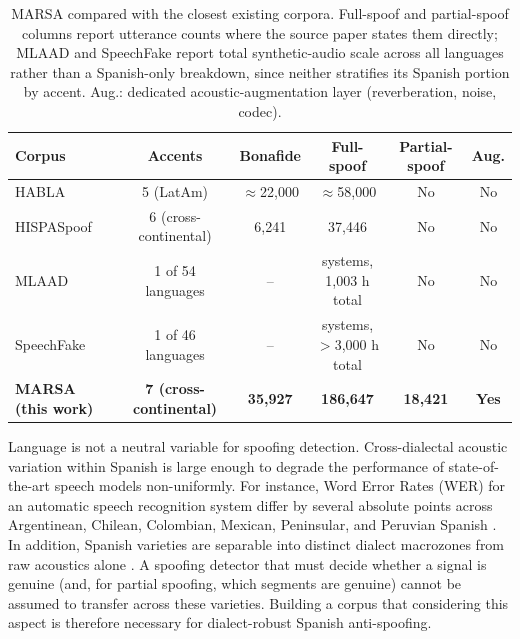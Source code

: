 \documentclass[11pt]{article}
\begin{document}
\begin{table}[H]
\centering
\caption{MARSA compared with the closest existing corpora. Full-spoof
and partial-spoof columns report utterance counts where the source
paper states them directly; MLAAD and SpeechFake report total
synthetic-audio scale across all languages rather than a Spanish-only
breakdown, since neither stratifies its Spanish portion by accent.
Aug.: dedicated acoustic-augmentation layer (reverberation, noise,
codec).}
\label{tab:corpuscompare}
\small
\begin{tabular}{lccccc}
\toprule
\textbf{Corpus} & \textbf{Accents} & \textbf{Bonafide} & \textbf{Full-spoof} & \textbf{Partial-spoof} & \textbf{Aug.} \\
\midrule
HABLA \citep{habla}      & 5 (LatAm)         & $\approx$22{,}000 & $\approx$58{,}000     & No & No \\
HISPASpoof \citep{hispaspoof} & 6 (cross-continental) & 6{,}241 & 37{,}446 & No & No \\
MLAAD \citep{mlaad}      & 1 of 54 languages & --      & \multicolumn{1}{c}{\parbox{2.1cm}{ systems,\\1{,}003 h total}} & No & No \\
SpeechFake \citep{speechfake} & 1 of 46 languages & -- & \multicolumn{1}{c}{\parbox{2.1cm}{ systems,\\$>$3{,}000 h total}} & No & No \\
\textbf{MARSA (this work)} & \textbf{7 (cross-continental)} & \textbf{35{,}927} & \textbf{186{,}647} & \textbf{18{,}421} & \textbf{Yes} \\
\bottomrule
\end{tabular}
\end{table}

Language is not a neutral variable for spoofing detection. Cross-dialectal acoustic variation within Spanish is large enough to degrade the performance of state-of-the-art speech models non-uniformly. For instance, Word Error Rates (WER) for an automatic speech recognition system differ by several absolute points across Argentinean, Chilean, Colombian, Mexican, Peninsular, and Peruvian Spanish \citep{kantharuban2023dialectgap,nacimiento2024biases}. In addition, Spanish varieties are separable into distinct dialect macrozones from raw acoustics alone \citep{zuluaga2023commonaccent}. A spoofing detector that must decide whether a signal is genuine (and, for partial spoofing, which segments are genuine) cannot be assumed to transfer across these varieties. Building a corpus that considering this aspect is therefore necessary for dialect-robust Spanish anti-spoofing.
\end{document}
